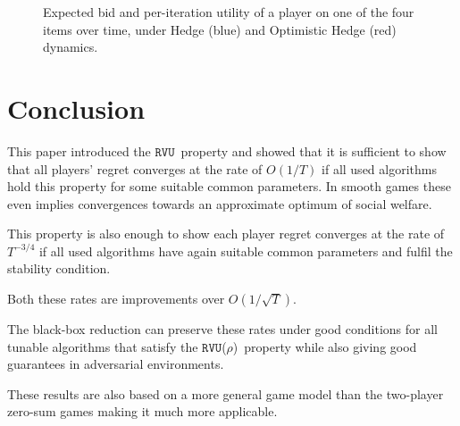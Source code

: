 \documentclass[a4paper]{article}
\theoremstyle{definition}
\newcommand{\myprop}{\ensuremath{\texttt{RVU}}}
\newcommand{\knob}{\ensuremath{\rho}}
\begin{document}
\begin{figure}[]
\centering
{}
\quad
{}
\caption{Expected bid and per-iteration utility of a player on one of
  the four items over time, under Hedge (blue) and {Optimistic Hedge}
  (red) dynamics.}\label{fig:bids}
\end{figure}


\section{Conclusion}

This paper introduced the \myprop~property and showed that it is
sufficient to show that all players' regret converges at the rate of
$O(1/T)$ if all used algorithms hold this property for some suitable common
parameters.
In smooth games these even implies convergences towards an approximate
optimum of social welfare.

This property is also enough to show each player regret converges at
the rate of $T^{-3/4}$ if all used algorithms have again suitable
common parameters and fulfil the stability condition.

Both these rates are improvements over $O(1/\sqrt{T})$.

The black-box reduction can preserve these rates under good conditions
for all tunable algorithms that satisfy the \myprop(\knob)~property
while also giving good guarantees in adversarial environments.

These results are also based on a more general game model than the
two-player zero-sum games making it much more applicable.
\end{document}
